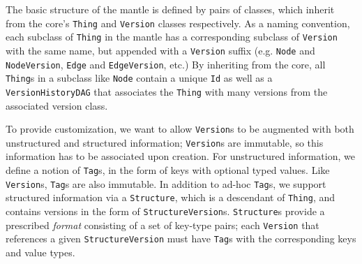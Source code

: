 \documentclass{article}
\newcommand{\core}{core\xspace}
\newcommand{\mantle}{mantle\xspace}
\newcommand{\version}{\texttt{Version}\xspace}
\newcommand{\thing}{\texttt{Thing}\xspace}
\newcommand{\node}{\texttt{Node}\xspace}
\newcommand{\edge}{\texttt{Edge}\xspace}
\newcommand{\structure}{\texttt{Structure}\xspace}
\newcommand{\tag}{\texttt{Tag}\xspace}
\newcommand{\jmh}[1]{{\textcolor{red}{#1---jmh}}}
\newcommand{\vikram}[1]{{\textcolor{blue}{#1---vikram}}}
\begin{document}
The basic structure of the \mantle is defined by pairs of classes,
which inherit from the \core's \thing and \version classes respectively.   As a
naming convention, each subclass of \thing in the mantle has a corresponding
subclass of \version with the same name, but appended with a \texttt{Version}
suffix (e.g. \node and \texttt{NodeVersion}, \edge and \texttt{EdgeVersion},
etc.)  By inheriting from the core, all {\thing}s in a
subclass like \node contain a unique \texttt{Id} as well as a
\texttt{VersionHistoryDAG} that associates the \thing with many versions from
the associated version class.  

To provide customization, we want to allow {\version}s to be augmented
with both unstructured and structured information; {\version}s are
immutable, so this information has to be associated upon creation. For unstructured information, 
we define a notion of {\tag}s, in the 
form of keys with optional typed values.  Like {\version}s, {\tag}s are also immutable.
In addition to ad-hoc {\tag}s,
we support structured information via a \structure, which is a descendant of \thing, and contains versions 
in the form of \texttt{StructureVersion}s. {\structure}s provide a prescribed \emph{format}
consisting of a set of key-type pairs; each \version that references a given \texttt{StructureVersion} 
must have {\tag}s with the corresponding 
keys and value types.
\end{document}

